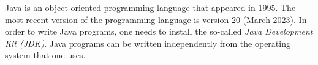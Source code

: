 
Java is an object-oriented programming language that appeared in 1995. The most recent version of the programming language is version 20 (March 2023). In order to write Java programs, one needs to install the so-called \emph{Java Development Kit (JDK)}. Java programs can be written independently from the operating system that one uses.